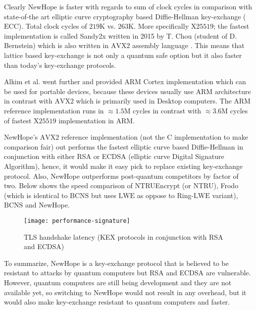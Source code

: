Clearly $\mathrm{NewHope}$ is faster with regards to sum of clock cycles in comparison with state-of-the art elliptic curve cryptography based Diffie-Hellman key-exchange ($\mathrm{ECC}$). Total clock cycles of $219\text{K}$ vs. $263\text{K}$. More specifically $\mathrm{X25519}$; the fastest implementation is called Sandy2x written in 2015 by T. Chou (student of D. Bernstein) which is also written in $\mathrm{AVX2}$ assembly language \cite{cryptoeprint:2015:943}. This means that lattice based key-exchange is not only a quantum safe option but it also faster than today's key-exchange protocols.

Alkim et al. went further and provided $\mathrm{ARM}$ Cortex implementation which can be used for portable devices, because these devices usually use $\mathrm{ARM}$ architecture in contrast with $\mathrm{AVX2}$ which is primarily used in Desktop computers. The $\mathrm{ARM}$ reference implementation runs in $\approx 1.5\text{M}$ cycles in contrast with $\approx 3.6 \text{M}$ cycles of fastest $\mathrm{X25519}$ implementation in ARM.

NewHope's $\mathrm{AVX2}$ reference implementation (not the $\mathrm{C}$ implementation to make comparison fair) out performs the fastest elliptic curve based Diffie-Hellman in conjunction with either RSA or ECDSA (elliptic curve Digital Signature Algorithm), hence, it would make it easy pick to replace existing key-exchange protocol. Also, NewHope outperforms post-quantum competitors by factor of two. Below shows the speed comparison of NTRUEncrypt (or NTRU), Frodo (which is identical to $\mathrm{BCNS}$ but uses $\mathrm{LWE}$ as oppose to Ring-$\mathrm{LWE}$ variant), $\mathrm{BCNS}$ and NewHope.

\begin{figure}[H]
    \centering
    \texttt{[image: performance-signature]}
    \caption{TLS handshake latency (KEX protocols in conjunction with RSA and ECDSA)}
\end{figure}


To summarize, NewHope is a key-exchange protocol that is believed to be resistant to attacks by quantum computers but RSA and ECDSA are vulnerable. However, quantum computers are still being development and they are not available yet, so switching to NewHope would not result in any overhead, but it would also make key-exchange resistant to quantum computers and faster.

